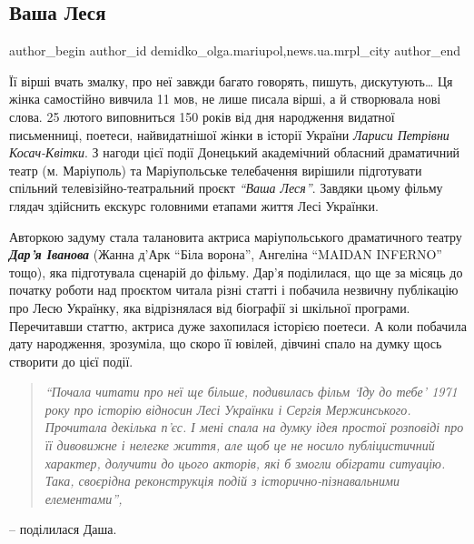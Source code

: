  
 
 
 
 
 
\subsection{Ваша Леся}
\label{sec:29_01_2021.stz.news.ua.mrpl_city.1.vasha_lesja}
 
\ifcmt
 author_begin
   author_id demidko_olga.mariupol,news.ua.mrpl_city
 author_end
\fi


Її вірші вчать змалку, про неї завжди багато говорять, пишуть, дискутують… Ця
жінка самостійно вивчила 11 мов, не лише писала вірші, а й створювала нові
слова. 25 лютого виповниться 150 років від дня народження видатної письменниці,
поетеси, найвидатнішої жінки в історії України \emph{Лариси Петрівни Косач-Квітки}. З
нагоди цієї події Донецький академічний обласний драматичний театр (м.
Маріуполь) та Маріупольське телебачення вирішили підготувати спільний
телевізійно-театральний проєкт \emph{\enquote{Ваша Леся}}. Завдяки цьому фільму глядач
здійснить екскурс головними етапами життя Лесі Українки.

Авторкою задуму стала талановита актриса маріупольського драматичного театру
\emph{\textbf{Дар'я Іванова}} (Жанна д'Арк \enquote{Біла ворона}, Ангеліна \enquote{MAIDAN INFERNO} тощо), яка
підготувала сценарій до фільму. Дар'я поділилася, що ще за місяць до початку
роботи над проєктом читала різні статті і побачила незвичну публікацію про Лесю
Українку, яка відрізнялася від біографії зі шкільної програми. Перечитавши
статтю, актриса дуже захопилася історією поетеси. А коли побачила дату
народження, зрозуміла, що скоро її ювілей, дівчині спало на думку щось створити
до цієї події.

\begin{quote}
\em\enquote{Почала читати про неї ще більше, подивилась фільм \enquote{Іду до тебе}
1971 року про історію відносин Лесі Українки і Сергія Мержинського. Прочитала
декілька п'єс. І мені спала на думку ідея простої розповіді про її дивовижне і
нелегке життя, але щоб це не носило публіцистичний характер, долучити до цього
акторів, які б змогли обіграти ситуацію. Така, своєрідна  реконструкція подій з
історично-пізнавальними елементами}, 
\end{quote}
– поділилася Даша.


